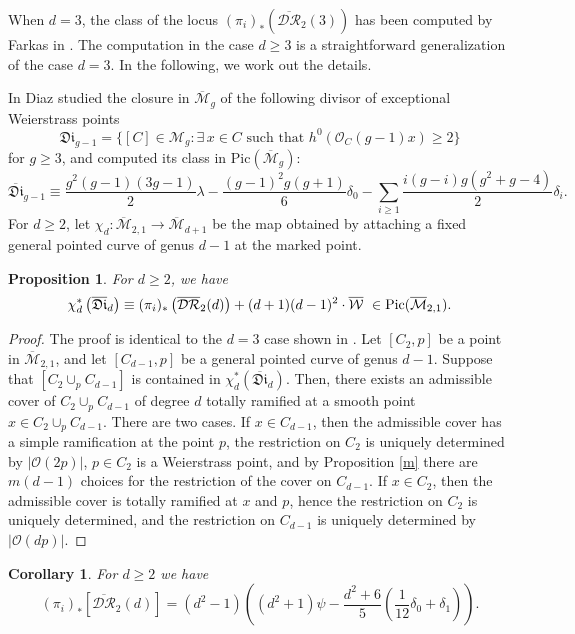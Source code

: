 \documentclass[10pt]{amsart}
\newtheorem{cor}{Corollary}[section]
\newtheorem{prop}{Proposition}[section]
\theoremstyle{definition}
\begin{document}
When $d=3$, the class of the locus $(\pi_i)_*\left( \overline{\mathcal{DR}}_2(3) \right)$ has been computed by Farkas in \cite[Proposition 4.1]{MR2574363}. The computation in the case $d\geq 3$ is a straightforward generalization of the case $d=3$. In the following, we work out the details.

In \cite{MR791679} Diaz studied the closure in ${\overline{\mathcal{M}}}_g$ of the following divisor of exceptional Weierstrass points
\[
 \mathfrak{Di}_{g-1}=\{[C]\in{\mathcal{M}}_g: \exists \, x\in C \,\,\mbox{such that}\,\,h^0(\mathcal{O}_C(g-1)x)\geq 2 \}
\]
for $g\geq 3$, and computed its class in $\textrm{Pic}({\overline{\mathcal{M}}}_g)$:
\[
 \overline{\mathfrak{Di}}_{g-1}\equiv \frac{g^2(g-1)(3g-1)}{2}\lambda-\frac{(g-1)^2 g (g+1)}{6}\delta_0-\sum_{i\geq 1}\frac{i(g-i)g(g^2+g-4)}{2}\delta_i.
\]
For $d\geq 2$, let $\chi_d\colon {\overline{\mathcal{M}}}_{2,1}\rightarrow {\overline{\mathcal{M}}}_{d+1}$ be the map obtained by attaching a fixed general pointed curve of genus $d-1$ at the marked point. 
 
\begin{prop} 
\label{Di}
For $d\geq 2$, we have
\[
 \chi_d^*\left(\overline{\mathfrak{Di}}_d\right) \equiv (\pi_i)_*\left( \overline{\mathcal{DR}}_2(d) \right) + (d+1)(d-1)^2 \cdot\overline{\mathcal{W}}\,\,\in \mbox{\rm Pic}({\overline{\mathcal{M}}}_{2,1}).
\]
\end{prop}

\begin{proof}
 The proof is identical to the $d=3$ case shown in \cite{MR2574363}. Let $[C_2,p]$ be a point in ${\overline{\mathcal{M}}}_{2,1}$, and let $[C_{d-1},p]$ be a general pointed curve of genus $d-1$. Suppose that $[C_2\cup_p C_{d-1}]$ is contained in $\chi_d^*\left(\overline{\mathfrak{Di}}_d\right)$. Then, there exists an admissible cover of $C_2\cup_p C_{d-1}$ of degree $d$ totally ramified at a smooth point $x\in C_2\cup_p C_{d-1}$. There are two cases. If $x\in C_{d-1}$, then the admissible cover has a simple ramification at the point $p$, the restriction on $C_2$ is uniquely determined by $|\mathcal{O}(2p)|$, $p\in C_2$ is a Weierstrass point, and by Proposition \ref{m} there are $m(d-1)$ choices for the restriction of the cover on $C_{d-1}$. If $x\in C_2$, then the admissible cover is totally ramified at $x$ and $p$, hence the restriction on $C_2$ is uniquely determined, and the restriction on $C_{d-1}$ is uniquely determined by $|\mathcal{O}(dp)|$. 
\end{proof}

\begin{cor}
\label{pfwdclass}
For $d\geq 2$ we have
\[
(\pi_i)_*\left[ \overline{\mathcal{DR}}_2(d) \right] = (d^2-1)\left((d^2+1)\psi-\frac{d^2+6}{5}\left(\frac{1}{12}\delta_0+\delta_1\right) \right).
\]
\end{cor}
\end{document}
